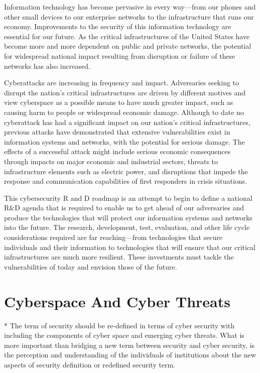 \documentclass[journal]{IEEEtran}
\begin{document}
Information technology has become pervasive in every way—from our phones and other small devices to our enterprise networks to the infrastructure that runs our economy. Improvements to the security of this information technology are essential for our future. As the critical infrastructures of the United States have become more and more dependent on public and private networks, the potential for widespread national impact resulting from disruption or failure of these networks has also increased.

Cyberattacks are increasing in frequency and impact. Adversaries seeking to disrupt the nation’s critical infrastructures are driven by different motives and view cyberspace as a possible
means to have much greater impact, such as causing harm to people or widespread
economic damage. Although to date no cyberattack has had a significant impact on
our nation’s critical infrastructures, previous attacks have demonstrated that extensive vulnerabilities exist in information systems and networks, with the potential for serious damage. The effects of a successful attack might include serious economic consequences through impacts on major economic and industrial sectors, threats to infrastructure elements such as electric power, and disruptions that impede the
response and communication capabilities of first responders in crisis situations.

This cybersecurity R and D roadmap  is an attempt to begin to define a national R\&D agenda that is required to enable us to get ahead of our adversaries and produce the technologies that will protect our information systems and networks into the future. The research, development, test, evaluation, and other life cycle considerations required are far reaching—from technologies that secure individuals and their information to technologies that will ensure that our critical infrastructures are much more resilient. These investments must tackle the vulnerabilities of today and envision those of the future.



\section{Cyberspace And Cyber Threats }
* The term of security should be re-defined in terms of cyber security with including the components of cyber space and emerging cyber threats. What is more important  than bridging a new term between security and cyber security, is the perception and understanding of the individuals of  institutions about the new aspects of security definition or redefined security term.
\end{document}

